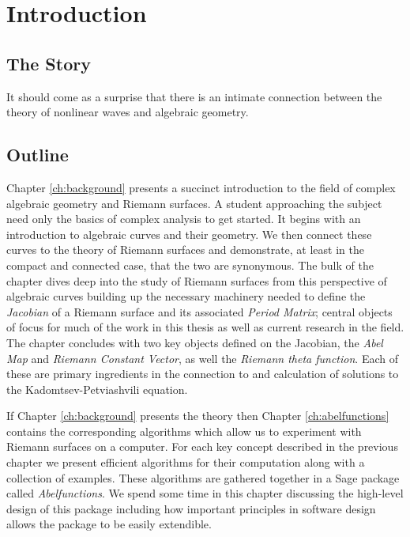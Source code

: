 \chapter{Introduction} \label{ch:Introduction}



\section{The Story} \label{sec:the-story}

It should come as a surprise that there is an intimate connection between the
theory of nonlinear waves and algebraic geometry.

\section{Outline} \label{sec:outline}

Chapter \ref{ch:background} presents a succinct introduction to the field of
complex algebraic geometry and Riemann surfaces. A student approaching the
subject need only the basics of complex analysis to get started. It begins with
an introduction to algebraic curves and their geometry. We then connect these
curves to the theory of Riemann surfaces and demonstrate, at least in the
compact and connected case, that the two are synonymous. The bulk of the chapter
dives deep into the study of Riemann surfaces from this perspective of algebraic
curves building up the necessary machinery needed to define the {\it Jacobian}
of a Riemann surface and its associated {\it Period Matrix}; central objects of
focus for much of the work in this thesis as well as current research in the
field. The chapter concludes with two key objects defined on the Jacobian, the
{\it Abel Map} and {\it Riemann Constant Vector}, as well the {\it Riemann theta
  function}. Each of these are primary ingredients in the connection to and
calculation of solutions to the Kadomtsev-Petviashvili equation.

If Chapter \ref{ch:background} presents the theory then Chapter
\ref{ch:abelfunctions} contains the corresponding algorithms which allow us to
experiment with Riemann surfaces on a computer. For each key concept described
in the previous chapter we present efficient algorithms for their computation
along with a collection of examples. These algorithms are gathered together in a
Sage package called {\it Abelfunctions}. We spend some time in this chapter
discussing the high-level design of this package including how important
principles in software design allows the package to be easily extendible. 

